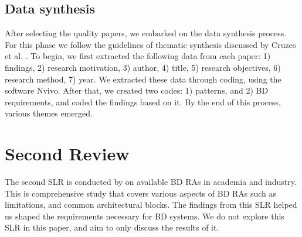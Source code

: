 \documentclass[a4paper,11pt,article,oneside]{memoir}
\begin{document}



\subsection{Data synthesis}

After selecting the quality papers, we embarked on the data synthesis process. For this phase we follow the guidelines of thematic synthesis discussed by Cruzes et al. \citet{Cruzes.2011}. To begin, we first extracted the following data from each paper: 1) findings, 2) research motivation, 3) author, 4) title, 5) research objectives, 6) research method, 7) year. We extracted these data through coding, using the software Nvivo. After that, we created two codes: 1) patterns, and 2) BD requirements, and coded the findings based on it. By the end of this process, various themes emerged. 






\section{Second Review}

The second SLR is conducted by \citet{ataei2022state} on available BD RAs in academia and industry. This is comprehensive study that covers various aspects of BD RAs such as limitations, and common architectural blocks. The findings from this SLR helped us shaped the requirements necessary for BD systems. We do not explore this SLR in this paper, and aim to only discuss the results of it.




\end{document}
